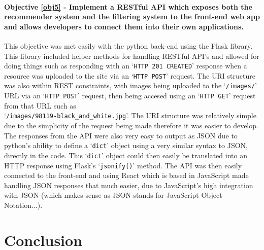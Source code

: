 \documentclass[a4paper,12pt]{report}
\begin{document}
  \subsubsection{Objective \ref{obj5} - Implement a RESTful API which exposes both the recommender system and the filtering system to the front-end web app and allows developers to connect them into their own applications.}
    This objective was met easily with the python back-end using the Flask library. This library included helper methods for handling RESTful API's and allowed for doing things such as responding with an ‘\texttt{HTTP 201 CREATED}’ response when a resource was uploaded to the site via an ‘\texttt{HTTP POST}’ request. The URI structure was also within REST constraints, with images being uploaded to the ‘\texttt{/images/}’ URL via an ‘\texttt{HTTP POST}’ request, then being accesed using an ‘\texttt{HTTP GET}’ request from that URL such as\\ ‘\texttt{/images/98119-black\_and\_white.jpg}’. The URI structure was relatively simple due to the simplicity of the request being made therefore it was easier to develop. The responses from the API were also very easy to output as JSON due to python's ability to define a ‘\texttt{dict}’ object using a very similar syntax to JSON, directly in the code. This ‘\texttt{dict}’ object could then easily be translated into an HTTP response using Flask's ‘\texttt{jsonify()}’ method. The API was then easily connected to the front-end and using React which is based in JavaScript made handling JSON responses that much easier, due to JavaScript's high integration with JSON (which makes sense as JSON stands for JavaScript Object Notation...).

\chapter{Conclusion}

\newpage
\singlespacing



\end{document}

